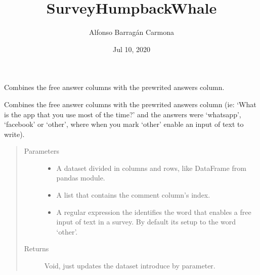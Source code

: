 \documentclass[letterpaper,10pt,english]{sphinxmanual}
\title{SurveyHumpbackWhale}
\date{Jul 10, 2020}
\author{Alfonso Barragán Carmona}
\begin{document}
\pagestyle{empty}
\sphinxmaketitle
\pagestyle{plain}
\sphinxtableofcontents
\pagestyle{normal}
\label{\detokenize{index::doc}}

\label{\detokenize{index:module-SurveyHumpbackWhale}}

\begin{fulllineitems}
\label{\detokenize{index:SurveyHumpbackWhale.combine_comment_columns}}
Combines the free answer columns with the pre\sphinxhyphen{}writed answers column.

Combines the free answer columns with the pre\sphinxhyphen{}writed answers column (ie:
‘What is the app that you use most of the time?’ and the answers were
‘whatsapp’, ‘facebook’ or ‘other’, where when you mark ‘other’ enable an
input of text to write).
\begin{quote}\begin{description}
\item[{Parameters}] \leavevmode\begin{itemize}
\item {} 
 \textendash{} A dataset divided in columns and rows, like DataFrame from
pandas module.

\item {} 
 \textendash{} A list that contains the comment column’s index.

\item {} 
 \textendash{} A regular expression the identifies the word that
enables a free input of text in a survey. By default
its setup to the word ‘other’.

\end{itemize}

\item[{Returns}] \leavevmode
Void, just updates the dataset introduce by parameter.

\end{description}\end{quote}

\end{fulllineitems}
\end{document}
